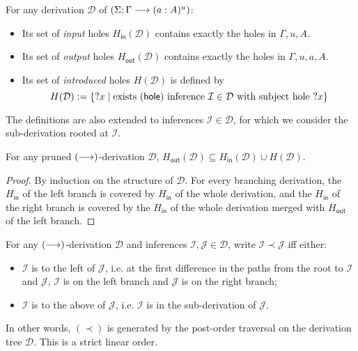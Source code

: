 \documentclass[twoside]{report}
\begin{document}
\begin{definition}
\label{def:focused_calculus_hole_sets}
For any derivation $\mathcal D$ of $(\Sigma; \Gamma \longrightarrow (a : A)^u)$:
\begin{itemize}[noitemsep]
    \item Its set of \emph{input} holes $H_{\mathsf{in}}(\mathcal D)$ contains exactly the holes in $\Gamma, u, A$.
    \item Its set of \emph{output} holes $H_{\mathsf{out}}(\mathcal D)$ contains exactly the holes in $\Gamma, u, a, A$.
    \item Its set of \emph{introduced} holes $H(\mathcal D)$ is defined by
    $$
    H(\mathcal D) := \{{?x} \mid \text{exists $(\mathsf{hole})$ inference } \mathcal I \in \mathcal D \text{ with subject hole } {?x}\}
    $$
\end{itemize}
The definitions are also extended to inferences $\mathcal I \in \mathcal D$, for which we consider the sub-derivation rooted at $\mathcal I$.
\end{definition}

\begin{proposition}
\label{thm:focused_calculus_hole_sets}
For any pruned $(\longrightarrow)$-derivation $\mathcal D$, $H_{\mathsf{out}}(\mathcal D) \subseteq H_{\mathsf{in}}(\mathcal D) \cup H(\mathcal D)$.
\end{proposition}

\begin{proof}
By induction on the structure of $\mathcal D$. For every branching derivation, the $H_{\mathsf{in}}$ of the left branch is covered by $H_{\mathsf{in}}$ of the whole derivation, and the $H_{\mathsf{in}}$ of the right branch is covered by the $H_{\mathsf{in}}$ of the whole derivation merged with $H_{\mathsf{out}}$ of the left branch.
\end{proof}

\begin{definition}
\label{def:focused_calculus_traversal_ordering}
For any $(\longrightarrow)$-derivation $\mathcal D$ and inferences $\mathcal I, \mathcal J \in \mathcal D$, write $\mathcal I \prec \mathcal J$ iff either:
\begin{itemize}[noitemsep]
    \item $\mathcal I$ is to the left of $\mathcal J$, i.e. at the first difference in the paths from the root to $\mathcal I$ and $\mathcal J$, $\mathcal I$ is on the left branch and $\mathcal J$ is on the right branch;
    \item $\mathcal I$ is to the above of $\mathcal J$, i.e. $\mathcal I$ is in the sub-derivation of $\mathcal J$.
\end{itemize}
In other words, $(\prec)$ is generated by the post-order traversal on the derivation tree $\mathcal D$. This is a strict linear order.
\end{definition}
\end{document}
